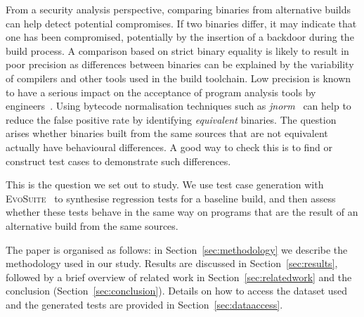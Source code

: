 \documentclass[conference]{IEEEtran}
\makeatletter
\newcommand{\evosuite}{\textsc{EvoSuite}\@\xspace}
\newcommand{\valerio}[1]{\textbf{\textcolor{blue}{[ \ding{46}Valerio: #1]}}}
\newcommand{\tim}[1]{\textbf{\textcolor{violet}{[ \ding{46}Tim: #1]}}}
\makeatother
\begin{document}
From a security analysis perspective, comparing binaries from alternative builds can help detect potential compromises. If two binaries differ, it may indicate that one has been compromised, potentially by the insertion of a backdoor during the build process. A comparison based on strict binary equality is likely to result in poor precision as differences between binaries can be explained by the variability of compilers and other tools used in the build toolchain. Low precision is known to have a serious impact on the acceptance of program analysis tools by engineers~\cite{sadowski2018lessons,distefano2019scaling}. Using bytecode normalisation techniques such as \textit{jnorm}~\cite{schott2024JNorm} can help to reduce the false positive rate by identifying \textit{equivalent} binaries. The question arises whether binaries built from the same sources that are not equivalent actually have behavioural differences. A good way to check this is to find or construct test cases to demonstrate such differences.

This is the question we set out to study. We use test case generation with \evosuite~\cite{fraser2011evosuite} to synthesise regression tests for a baseline build, and then assess whether these tests behave in the same way on programs that are the result of an alternative  build from the same sources. 

The paper is organised as follows: in Section~\ref{sec:methodology} we describe the methodology used in our study.  Results are discussed in Section~\ref{sec:results}, followed by a brief overview of related work in Section~\ref{sec:relatedwork} and the conclusion (Section~\ref{sec:conclusion}). Details on how to access the dataset used and the generated tests are provided in Section~\ref{sec:dataaccess}. 
\end{document}
